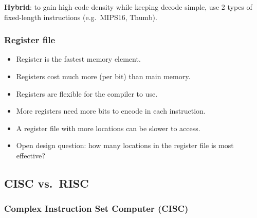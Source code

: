 \begin{note}
\textbf{Hybrid}: to gain high code density while keeping decode simple, use
2 types of fixed-length instructions (e.g.\ MIPS16, Thumb).
\end{note}

\subsubsection{Register file}

\begin{itemize}
  \item Register is the fastest memory element.
  \item Registers cost much more (per bit) than main memory.
  \item Registers are flexible for the compiler to use.
  \item More registers need more bits to encode in each instruction.
  \item A register file with more locations can be slower to access.
  \item Open design question: how many locations in the register file is
  most effective?
\end{itemize}

\subsection{CISC vs.\ RISC}
\label{sec:cisc-risc}

\subsubsection{Complex Instruction Set Computer (CISC)}

